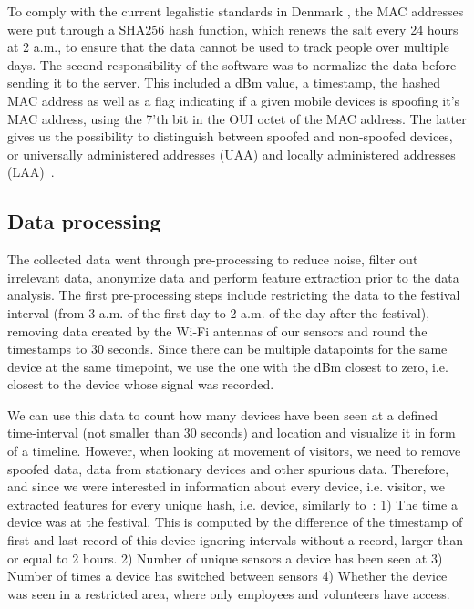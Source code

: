 To comply with the current legalistic standards in Denmark \cite{blip}, the MAC addresses were put through a SHA256 hash function, which renews the salt every 24 hours at 2 a.m., to ensure that the data cannot be used to track people over multiple days. The second responsibility of the software was to normalize the data before sending it to the server. This included a dBm value, a timestamp, the hashed MAC address as well as a flag indicating if a given mobile devices is spoofing it’s MAC address, using the 7’th bit in the OUI octet of the MAC address. The latter gives us the possibility to distinguish between spoofed and non-spoofed devices, or universally administered addresses (UAA) and locally administered addresses (LAA)~\cite{spoofing}.

\subsection{Data processing} \label{sec:dataproc}
The collected data went through pre-processing to reduce noise, filter out irrelevant data, anonymize data and perform feature extraction prior to the data analysis. The first pre-processing steps include restricting the data to the festival interval (from 3 a.m. of the first day to 2 a.m. of the day after the festival), removing data created by the Wi-Fi antennas of our sensors and round the timestamps to 30 seconds. Since there can be multiple datapoints for the same device at the same timepoint, we use the one with the dBm closest to zero, i.e. closest to the device whose signal was recorded.

We can use this data to count how many devices have been seen at a defined time-interval (not smaller than 30 seconds) and location and visualize it in form of a timeline. However, when looking at movement of visitors, we need to remove spoofed data, data from stationary devices and other spurious data. Therefore, and since we were interested in information about every device, i.e. visitor, we extracted features for every unique hash, i.e. device, similarly to~\cite{largescalemonitoring}: 1) The time a device was at the festival. This is computed by the difference of the timestamp of first and last record of this device ignoring intervals without a record, larger than or equal to 2 hours. 2) Number of unique sensors a device has been seen at 3) Number of times a device has switched between sensors 4) Whether the device was seen in a restricted area, where only employees and volunteers have access.

